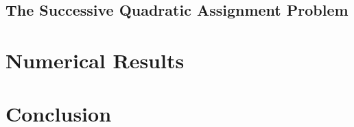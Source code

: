 \documentclass{article}
\begin{document}
\subsection{The Successive Quadratic Assignment Problem}
\label{ssec:qap}





\section{Numerical Results}
\label{sec:numerical}
 
 
 

\section{Conclusion}
\label{sec:conclusion}




\vfill\pagebreak



\end{document}
